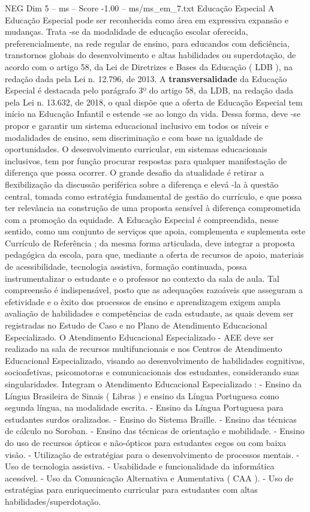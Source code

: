 \begin{textsample}{NEG Dim 5 – ms – Score -1.00 – ms/ms\_em\_7.txt}
Educação Especial A Educação Especial pode ser reconhecida como área em expressiva expansão e mudanças.
Trata -se da modalidade de educação escolar oferecida, preferencialmente, na rede regular de ensino, para educandos com deficiência, transtornos globais do desenvolvimento e altas habilidades ou superdotação, de acordo com o artigo 58, da Lei de Diretrizes e Bases da Educação ( LDB ), na redação dada pela Lei n. 12.796, de 2013.
A \textbf{transversalidade} da Educação Especial é destacada pelo parágrafo 3º do artigo 58, da LDB, na redação dada pela Lei n. 13.632, de 2018, o qual dispõe que a oferta de Educação Especial tem início na Educação Infantil e estende -se ao longo da vida.
Dessa forma, deve -se propor e garantir um sistema educacional inclusivo em todos os níveis e modalidades de ensino, sem discriminação e com base na igualdade de oportunidades.
O desenvolvimento curricular, em sistemas educacionais inclusivos, tem por função procurar respostas para qualquer manifestação de diferença que possa ocorrer.
O grande desafio da atualidade é retirar a flexibilização da discussão periférica sobre a diferença e elevá -la à questão central, tomada como estratégia fundamental de gestão do currículo, e que possa ter relevância na construção de uma proposta sensível à diferença comprometida com a promoção da equidade.
A Educação Especial é compreendida, nesse sentido, como um conjunto de serviços que apoia, complementa e suplementa este Currículo de Referência ; da mesma forma articulada, deve integrar a proposta pedagógica da escola, para que, mediante a oferta de recursos de apoio, materiais de acessibilidade, tecnologia assistiva, formação continuada, possa instrumentalizar o estudante e o professor no contexto da sala de aula.
Tal compreensão é indispensável, posto que as adequações razoáveis que asseguram a efetividade e o êxito dos processos de ensino e aprendizagem exigem ampla avaliação de habilidades e competências de cada estudante, as quais devem ser registradas no Estudo de Caso e no Plano de Atendimento Educacional Especializado.
O Atendimento Educacional Especializado - AEE deve ser realizado na sala de recursos multifuncionais e nos Centros de Atendimento Educacional Especializado, visando ao desenvolvimento de habilidades cognitivas, socioafetivas, psicomotoras e comunicacionais dos estudantes, considerando suas singularidades.
Integram o Atendimento Educacional Especializado : - Ensino da Língua Brasileira de Sinais ( Libras ) e ensino da Língua Portuguesa como segunda língua, na modalidade escrita. - Ensino da Língua Portuguesa para estudantes surdos oralizados. - Ensino do Sistema Braille. - Ensino das técnicas de cálculo no Soroban. - Ensino das técnicas de orientação e mobilidade. - Ensino do uso de recursos ópticos e não-ópticos para estudantes cegos ou com baixa visão. - Utilização de estratégias para o desenvolvimento de processos mentais. - Uso de tecnologia assistiva. - Usabilidade e funcionalidade da informática acessível. - Uso da Comunicação Alternativa e Aumentativa ( CAA ). - Uso de estratégias para enriquecimento curricular para estudantes com altas habilidades/superdotação.

\end{textsample}
